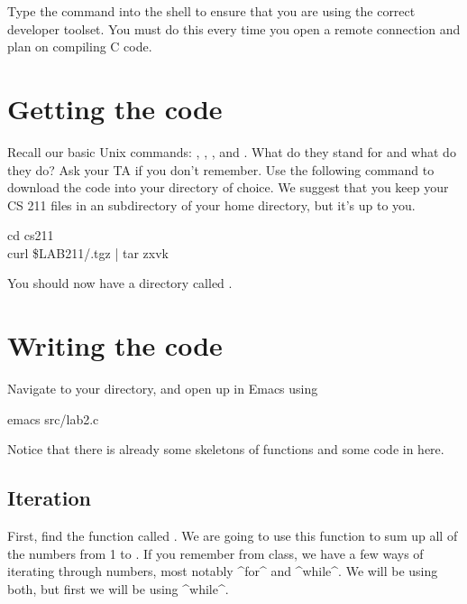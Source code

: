 \documentclass{tufte-handout}
\begin{document}
Type the  command into the shell to ensure that you are
using the correct developer toolset. You must do this every time you
open a remote connection and plan on compiling C code.

\section{Getting the code}

Recall our basic Unix commands: , , , and . What do they stand for and what do they do? Ask your TA if you don't remember. Use the following  command to download the code into your directory of choice. We suggest that you keep your CS 211 files in an  subdirectory of your home directory, but it's up to you.

\begin{CmdLine*}
  \C cd cs211\\
  \C curl \$LAB211/\ThisLabBase.tgz | tar zxvk\\
\end{CmdLine*}

You should now have a directory called \filename{\ThisLabBase}.

\section{Writing the code}
Navigate to your \filename{\LabBaseUrl} directory, and open up
 in Emacs using 
\begin{CmdLine*}
  \C emacs src/lab2.c\\
\end{CmdLine*}
Notice that there is already some skeletons of functions and some code in  here.

\subsection{Iteration}

First, find the function called
. We are going to use this function to sum up all of the numbers
from 1 to .  If you remember from class, we have a few ways
of iterating through numbers, most notably ^for^ and ^while^.  We will
be using both, but first we will be using ^while^.
\end{document}
